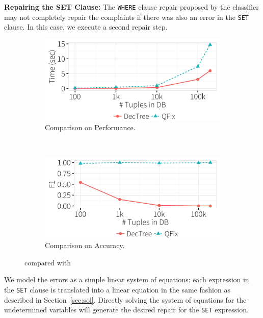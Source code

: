 \noindent
\textbf{Repairing the SET Clause:}
The \texttt{WHERE} clause repair proposed by the classifier may not completely repair 
the complaints if there was also an error in the \texttt{SET} clause. 
In this case, we execute a second repair step.
\begin{figure}[t]
\centering
  \begin{subfigure} [t]{.75\columnwidth}
  \includegraphics[width = .88\columnwidth]{figures/heuristictime}
  \caption{Comparison on Performance.}
  \label{f:heuristic_time} 
  \end{subfigure}\\

  \begin{subfigure} [t]{.75\columnwidth}
  \includegraphics[width = .88\columnwidth]{figures/heuristicacc}
  \caption{Comparison on Accuracy.}
  \label{f:heuristic_acc} 
  \end{subfigure}
 \caption{\dt compared with \sys}
 \label{f:heuristic}
 \vspace{-4mm}
\end{figure}

We model the errors as a simple linear system of equations: 
each expression in the \texttt{SET} clause is translated into a
linear equation in the same fashion as described in Section~\ref{sec:sol}.
Directly solving the system of equations for the undetermined variables 
will generate the desired repair for the \texttt{SET} expression.



